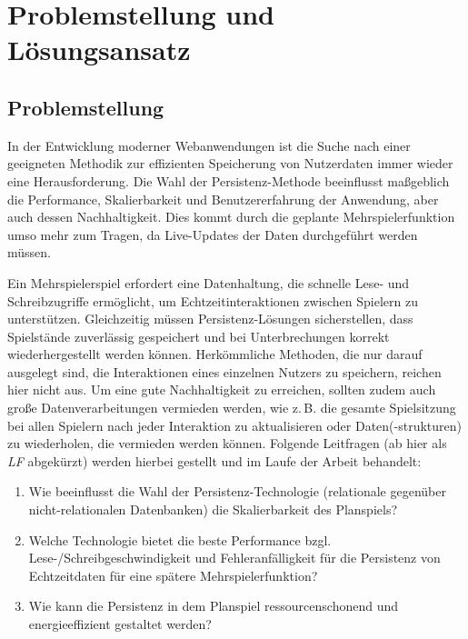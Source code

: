 \documentclass[11pt]{scrartcl}
\newcommand{\zB}{\mbox{z.\,B.}\xspace}
\newcommand{\bzgl}{bzgl.\xspace}
\begin{document}
	\pagebreak
	
	\section{\label{sec:problem_loesung}Problemstellung und Lösungsansatz}

	\subsection{Problemstellung}
	
    In der Entwicklung moderner Webanwendungen ist die Suche nach einer geeigneten Methodik zur effizienten Speicherung von Nutzerdaten immer wieder eine Herausforderung. Die Wahl der Persistenz-Methode beeinflusst maßgeblich die Performance, Skalierbarkeit und Benutzererfahrung der Anwendung, aber auch dessen Nachhaltigkeit. Dies kommt durch die geplante Mehrspielerfunktion umso mehr zum Tragen, da Live-Updates der Daten durchgeführt werden müssen.

    Ein Mehrspielerspiel erfordert eine Datenhaltung, die schnelle Lese- und Schreibzugriffe ermöglicht, um Echtzeitinteraktionen zwischen Spielern zu unterstützen. Gleichzeitig müssen Persistenz-Lösungen sicherstellen, dass Spielstände zuverlässig gespeichert und bei Unterbrechungen korrekt wiederhergestellt werden können. Herkömmliche Methoden, die nur darauf ausgelegt sind, die Interaktionen eines einzelnen Nutzers zu speichern, reichen hier nicht aus. Um eine gute Nachhaltigkeit zu erreichen, sollten zudem auch große Datenverarbeitungen vermieden werden, wie \zB die gesamte Spielsitzung bei allen Spielern nach jeder Interaktion zu aktualisieren oder Daten(-strukturen) zu wiederholen, die vermieden werden können. Folgende Leitfragen (ab hier als \textit{LF} abgekürzt) werden hierbei gestellt und im Laufe der Arbeit behandelt:
    
    \begin{enumerate}[label=\textbf{LF\arabic*}]
        \item\label{frage:1} Wie beeinflusst die Wahl der Persistenz-Technologie (relationale gegenüber nicht-relationalen Datenbanken) die Skalierbarkeit des Planspiels?
        \item\label{frage:2} Welche Technologie bietet die beste Performance \bzgl{} Lese-/Schreibgeschwindigkeit und Fehleranfälligkeit für die Persistenz von Echtzeitdaten für eine spätere Mehrspielerfunktion?
        \item\label{frage:3} Wie kann die Persistenz in dem Planspiel ressourcenschonend und energieeffizient gestaltet werden?
    \end{enumerate}
    
\end{document}

